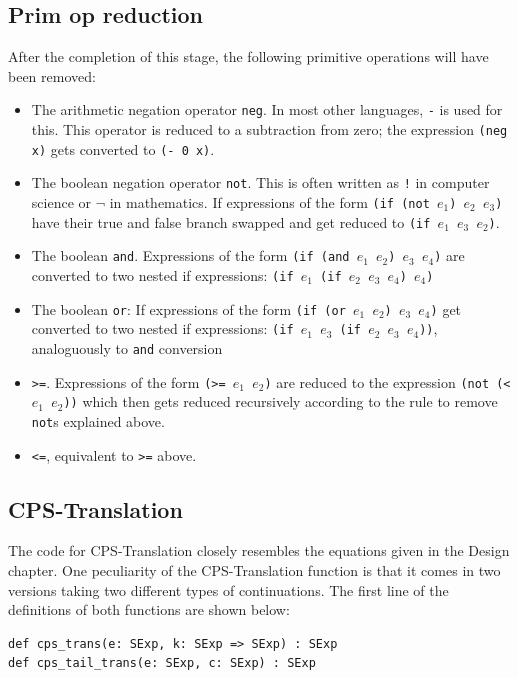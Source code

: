 \documentclass[11pt]{report}
\begin{document}
\subsection{Prim op reduction}
After the completion of this stage, the following primitive operations will have been removed: 
\begin{itemize}
\item The arithmetic negation operator \texttt{neg}. In most other languages, \texttt{-} is used for this. This operator is reduced to a subtraction from zero; the expression \texttt{(neg x)} gets converted to \texttt{(- 0 x)}.
\item The boolean negation operator \texttt{not}. This is often written as \texttt{!} in computer science or $\neg$ in mathematics. If expressions of the form \texttt{(if (not $e_1$) $e_2$ $e_3$)} have their true and false branch swapped and get reduced to \texttt{(if $e_1$ $e_3$ $e_2$)}.
\item The boolean \texttt{and}. Expressions of the form \texttt{(if (and $e_1$ $e_2$) $e_3$ $e_4$)} are converted to two nested if expressions: \texttt{(if $e_1$ (if $e_2$ $e_3$ $e_4$) $e_4$)}
\item The boolean \texttt{or}: If expressions of the form \texttt{(if (or $e_1$ $e_2$) $e_3$ $e_4$)} get converted to two nested if expressions: \texttt{(if $e_1$ $e_3$ (if $e_2$ $e_3$ $e_4$))}, analoguously to \texttt{and} conversion
\item \texttt{>=}. Expressions of the form \texttt{(>= $e_1$ $e_2$)} are reduced to the expression \texttt{(not (< $e_1$ $e_2$))} which then gets reduced recursively according to the rule to remove \texttt{not}s explained above.
\item \texttt{<=}, equivalent to \texttt{>=} above.
\end{itemize}

\subsection{CPS-Translation}
The code for CPS-Translation closely resembles the equations given in the Design chapter. One peculiarity of the CPS-Translation function is that it comes in two versions taking two different types of continuations. The first line of the definitions of both functions are shown below:

\begin{lstlisting}
def cps_trans(e: SExp, k: SExp => SExp) : SExp
def cps_tail_trans(e: SExp, c: SExp) : SExp
\end{lstlisting}
\end{document}

